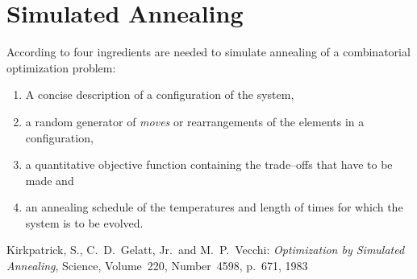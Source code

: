 \documentclass[11pt,a4paper]{report}
\begin{document}




\section{Simulated Annealing}

According to \cite{Kirkpatrick1983} four ingredients are needed to simulate
annealing of a combinatorial optimization problem:
\begin{enumerate}
\item A concise description of a configuration of the system,
\item a random generator of {\em moves} or rearrangements of the elements
      in a configuration,
\item a quantitative objective function containing the trade--offs that
      have to be made and 
\item an annealing schedule of the temperatures and length of times for
      which the system is to be evolved. 
\end{enumerate} 

\begin{thebibliography}{99}

 Kirkpatrick, S., C.\ D.\ Gelatt, Jr.\ and M.\ P.\ Vecchi:
\emph{Optimization by Simulated Annealing},
Science, Volume~220, Number~4598, p.~671, 1983

\end{thebibliography}
\end{document}
